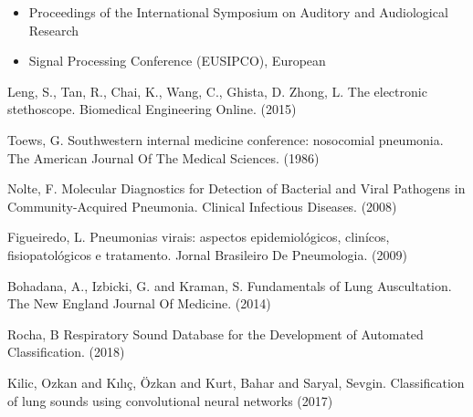 \documentclass[letterpaper, 10 pt, conference]{ieeeconf}  %
\begin{document}
\begin{itemize}
\item Proceedings of the International Symposium on Auditory and Audiological Research
\item Signal Processing Conference (EUSIPCO), European
\end{itemize}


\begin{thebibliography}{99}

Leng, S., Tan, R., Chai, K., Wang, C., Ghista, D. Zhong, L. The electronic stethoscope.  Biomedical Engineering Online.  (2015)

Toews, G. Southwestern internal medicine conference: nosocomial pneumonia.  The American Journal Of The Medical Sciences.  (1986)

Nolte, F. Molecular Diagnostics for Detection of Bacterial and Viral Pathogens in Community-Acquired Pneumonia. Clinical Infectious Diseases.  (2008)

Figueiredo, L. Pneumonias virais: aspectos epidemiológicos, clinícos, fisiopatológicos e tratamento. Jornal Brasileiro De Pneumologia. (2009)

Bohadana, A., Izbicki, G. and Kraman, S. Fundamentals of Lung Auscultation. The New England Journal Of Medicine. (2014)

Rocha, B Respiratory Sound Database for the Development of Automated Classification.  (2018)

Kilic, Ozkan and Kılıç, Özkan and Kurt, Bahar and Saryal, Sevgin. 
Classification of lung sounds using convolutional neural networks (2017)

\end{thebibliography}
\end{document}
